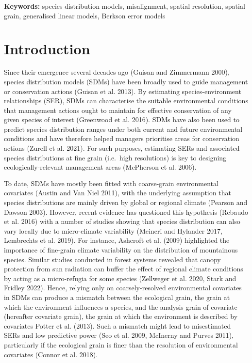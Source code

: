 \documentclass[
  12pt,
  a4paper]{article}
\begin{document}
\textbf{Keywords:} species distribution models, misalignment, spatial resolution, spatial grain, generalised linear models, Berkson error models

\hypertarget{introduction}{%
\section{Introduction}\label{introduction}}

Since their emergence several decades ago (Guisan and Zimmermann 2000), species distribution models (SDMs) have been broadly used to guide management or conservation actions (Guisan et al. 2013). By estimating species-environment relationships (SER), SDMs can characterise the suitable environmental conditions that management actions ought to maintain for effective conservation of any given species of interest (Greenwood et al. 2016). SDMs have also been used to predict species distribution ranges under both current and future environmental conditions and have therefore helped managers prioritise areas for conservation actions (Zurell et al. 2021). For such purposes, estimating SERs and associated species distributions at fine grain (i.e.~high resolutions) is key to designing ecologically-relevant management areas (McPherson et al. 2006).

To date, SDMs have mostly been fitted with coarse-grain environmental covariates (Austin and Van Niel 2011), with the underlying assumption that species distributions are mainly driven by global or regional climate (Pearson and Dawson 2003). However, recent evidence has questioned this hypothesis (Rebaudo et al. 2016) with a number of studies showing that species distribution can also vary locally due to micro-climate variability (Meineri and Hylander 2017, Lembrechts et al. 2019). For instance, Ashcroft et al. (2009) highlighted the importance of fine-grain climate variability on the distribution of mountainous species. Similar studies conducted in forest systems revealed that canopy protection from sun radiation can buffer the effect of regional climate conditions by acting as a micro-refugia for some species (Zellweger et al. 2020, Stark and Fridley 2022). Hence, relying only on coarsely-resolved environmental covariates in SDMs can produce a mismatch between the ecological grain, the grain at which the environment influences a species, and the analysis grain of covariate (hereafter covariate grain), the grain at which the environment is described by covariates Potter et al. (2013). Such a mismatch might lead to misestimated SERs and low predictive power (Seo et al. 2009, McInerny and Purves 2011), particularly if the ecological grain is finer than the resolution of environmental covariates (Connor et al. 2018).
\end{document}
